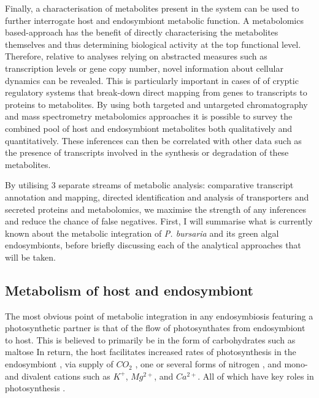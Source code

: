 %

Finally, a characterisation of metabolites present in the system can be used
to further interrogate host and endosymbiont metabolic function.  A metabolomics
based-approach has the benefit of directly characterising the metabolites
themselves and thus determining biological activity at the top functional level.
Therefore, relative to analyses relying on abstracted measures such as 
transcription levels or gene copy number, novel information about cellular dynamics
can be revealed. This is particularly important in cases of 
of cryptic regulatory systems that break-down direct mapping from genes to 
transcripts to proteins to metabolites. 
By using both targeted and untargeted chromatography and mass
spectrometry metabolomics approaches it is possible to survey the combined
pool of host and endosymbiont metabolites both qualitatively and quantitatively. 
These inferences can then be correlated with other data such as the
presence of transcripts involved in the synthesis or degradation of these metabolites. 

By utilising 3 separate streams of metabolic analysis: comparative transcript annotation
and mapping, directed identification and analysis of transporters and secreted
proteins and metabolomics, we maximise the strength of any inferences and 
reduce the chance of false negatives.
First, I will summarise what is currently known about the metabolic
integration of \textit{P. bursaria} and its green algal endosymbionts, before
briefly discussing each of the analytical approaches that will be taken.


\subsection{Metabolism of host and endosymbiont}

The most obvious point of metabolic integration in any endosymbiosis
featuring a photosynthetic partner is that of the flow of photosynthates
from endosymbiont to host.
This is believed to primarily be in the form of carbohydrates such as maltose \citep{Muscatine1967}
In return, the host facilitates increased rates of photosynthesis in the endosymbiont \citep{Sommaruga2009},
via supply of \(CO_{2}\) \citep{Parker1926}, one or several forms of nitrogen \citep{Johnson2011},
and mono- and divalent cations such as \(K^{+}\), \(Mg^{2+}\), and \(Ca^{2+}\). 
All of which have key roles in photosynthesis \citep{Kato2009a}.

